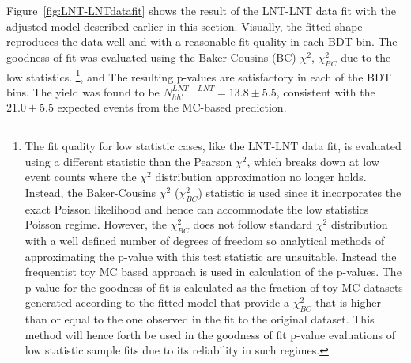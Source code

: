 Figure~\ref{fig:LNT-LNTdatafit} shows the result of the LNT-LNT data fit with the adjusted model described earlier in this section. Visually, the fitted shape reproduces the data well and with a reasonable fit quality in each BDT bin. The goodness of fit was evaluated using the Baker-Cousins (BC) $\chi^{2}$,  $\chi^{2}_{BC}$ due to the low statistics. \footnote{The fit quality for low statistic cases, like the LNT-LNT data fit, is evaluated using a different statistic than the Pearson $\chi^2$, which breaks down at low event counts where the $\chi^{2}$ distribution approximation no longer holds. Instead, the Baker-Cousins $\chi^{2}$ ($\chi^{2}_{BC}$) statistic is used since it incorporates the exact Poisson likelihood and hence can accommodate the low statistics Poisson regime. However, the $\chi^{2}_{BC}$ does not follow standard $\chi^{2}$ distribution with a well defined number of degrees of freedom so analytical methods of approximating the p-value with this test statistic are unsuitable. Instead the frequentist toy MC based approach is used in calculation of the p-values. The p-value for the goodness of fit is calculated as the fraction of toy MC datasets generated according to the fitted model that provide a $\chi^{2}_{BC}$ that is higher than or equal to the one observed in the fit to the original dataset. This method will hence forth be used in the goodness of fit p-value evaluations of low statistic sample fits due to its reliability in such regimes.}, and
The resulting p-values are satisfactory in each of the BDT bins. 
The \Bhh yield was found to be $N^{LNT-LNT}_{hh'} = 13.8 \pm 5.5$, consistent with the $21.0 \pm 5.5$ expected events from the MC-based prediction.
